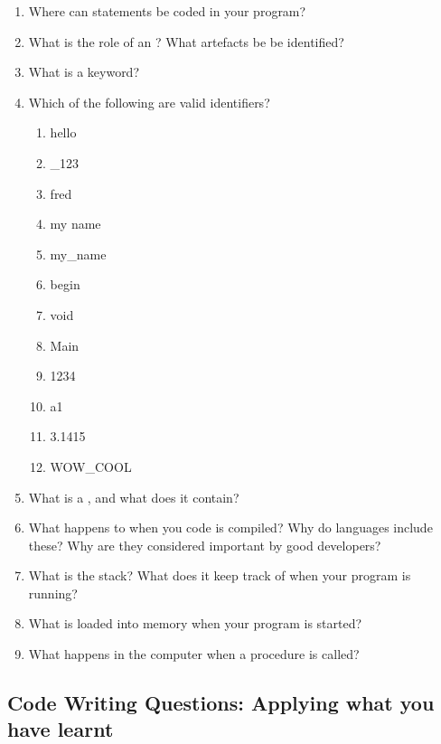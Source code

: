 \begin{enumerate}
\begin{multicols}{3}
\begin{enumerate}
    \item 'Fred Smith' (Pascal)
  \end{enumerate} 
  \end{multicols}
  \item Where can statements be coded in your program?
  \item What is the role of an ? What artefacts be be identified?
  \item What is a keyword?
  \item Which of the following are valid identifiers?
  \begin{multicols}{4}
    \ttfamily
    \begin{enumerate}
      \item hello
      \item \_123
      \item fred
      \item my name
      \item my\_name
      \item begin
      \item void
      \item Main
      \item 1234
      \item a1
      \item 3.1415
      \item WOW\_COOL
    \end{enumerate}
  \end{multicols}
  \item What is a , and what does it contain?
  \item What happens to  when you code is compiled? Why do languages include these? Why are they considered important by good developers?
  \item What is the stack? What does it keep track of when your program is running?
  \item What is loaded into memory when your program is started?
  \item What happens in the computer when a procedure is called?
\end{enumerate}

\clearpage
\subsection{Code Writing Questions: Applying what you have learnt} %
\label{sub:code_writing_questions_applying_what_you_have_learnt_prog}

